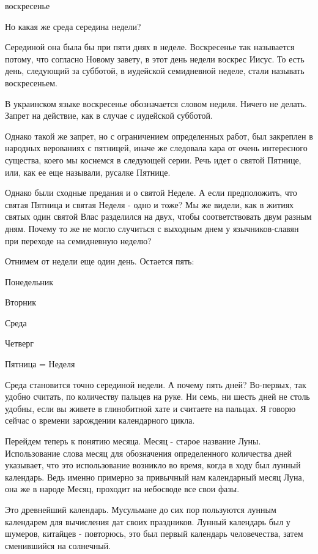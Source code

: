 \documentclass[a5paper,11pt,openany]{article}
\begin{document}
воскресенье

   Но какая же среда середина недели? 

Серединой она была бы при пяти днях в неделе.  Воскресенье так называется потому, что согласно Новому завету, в этот день недели воскрес Иисус. То есть день, следующий за субботой, в иудейской семидневной неделе, стали называть воскресеньем.

   В украинском языке воскресенье обозначается словом недиля. Ничего не делать. Запрет на действие, как в случае с иудейской субботой.

   Однако такой же запрет, но с ограничением определенных работ, был закреплен в народных верованиях с пятницей, иначе же следовала кара от очень интересного существа, коего мы коснемся в следующей серии. Речь идет о святой Пятнице, или, как ее еще называли, русалке Пятнице.

   Однако были сходные предания и о святой Неделе. А если предположить, что святая Пятница и святая Неделя - одно и тоже? Мы же видели, как в житиях святых один святой Влас разделился на двух, чтобы соответствовать двум разным дням. Почему то же не могло случиться с выходным днем у язычников-славян при переходе на семидневную неделю?

   Отнимем от недели еще один день. Остается пять: 

Понедельник

Вторник

Среда

Четверг

Пятница = Неделя

Среда становится точно серединой недели. А почему пять дней? Во-первых, так удобно считать, по количеству пальцев на руке. Ни семь, ни шесть дней не столь удобны, если вы живете в глинобитной хате и считаете на пальцах. Я говорю сейчас о времени зарождении календарного цикла.

   Перейдем теперь к понятию месяца. Месяц - старое название Луны. Использование слова месяц для обозначения определенного количества дней указывает, что это использование возникло во время, когда в ходу был лунный календарь. Ведь именно примерно за привычный нам календарный месяц Луна, она же в народе Месяц, проходит на небосводе все свои фазы.

   Это древнейший календарь. Мусульмане до сих пор пользуются лунным календарем для вычисления дат своих праздников. Лунный календарь был у шумеров, китайцев - повторюсь, это был первый календарь человечества, затем сменившийся на солнечный.
\end{document}
